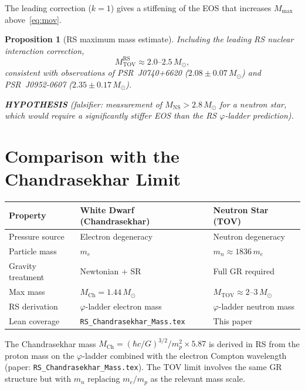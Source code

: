 \documentclass[12pt,a4paper]{article}
\newtheorem{proposition}[theorem]{Proposition}
\theoremstyle{definition}
\theoremstyle{remark}
\begin{document}
The leading correction ($k = 1$) gives a stiffening of the EOS that
increases $M_\mathrm{max}$ above~\eqref{eq:mov}.

\begin{proposition}[RS maximum mass estimate]\label{prop:rs_mass}
Including the leading RS nuclear interaction correction,
\begin{equation}
  M_\mathrm{TOV}^\mathrm{RS} \approx 2.0\text{--}2.5\,M_\odot,
  \label{eq:mmax}
\end{equation}
consistent with observations of PSR~J0740+6620 ($2.08\pm0.07\,M_\odot$)
and PSR~J0952-0607 ($2.35\pm0.17\,M_\odot$).

\textbf{HYPOTHESIS} (falsifier: measurement of $M_\mathrm{NS} > 2.8\,M_\odot$
for a neutron star, which would require a significantly stiffer EOS
than the RS $\varphi$-ladder prediction).
\end{proposition}

\section{Comparison with the Chandrasekhar Limit}
\label{sec:chandrasekhar}

\begin{center}
\begin{tabular}{lll}
\toprule
Property & White Dwarf (Chandrasekhar) & Neutron Star (TOV) \\
\midrule
Pressure source & Electron degeneracy & Neutron degeneracy \\
Particle mass & $m_e$ & $m_n \approx 1836\,m_e$ \\
Gravity treatment & Newtonian + SR & Full GR required \\
Max mass & $M_\mathrm{Ch} = 1.44\,M_\odot$ & $M_\mathrm{TOV} \approx 2$--$3\,M_\odot$ \\
RS derivation & $\varphi$-ladder electron mass & $\varphi$-ladder neutron mass \\
Lean coverage & \texttt{RS\_Chandrasekhar\_Mass.tex} & This paper \\
\bottomrule
\end{tabular}
\end{center}

The Chandrasekhar mass $M_\mathrm{Ch} = (\hbar c/G)^{3/2}/m_p^2 \times
5.87$ is derived in RS from the proton mass on the $\varphi$-ladder
combined with the electron Compton wavelength (paper:
\texttt{RS\_Chandrasekhar\_Mass.tex}).  The TOV limit involves the same
GR structure but with $m_n$ replacing $m_e/m_p$ as the relevant mass
scale.
\end{document}

